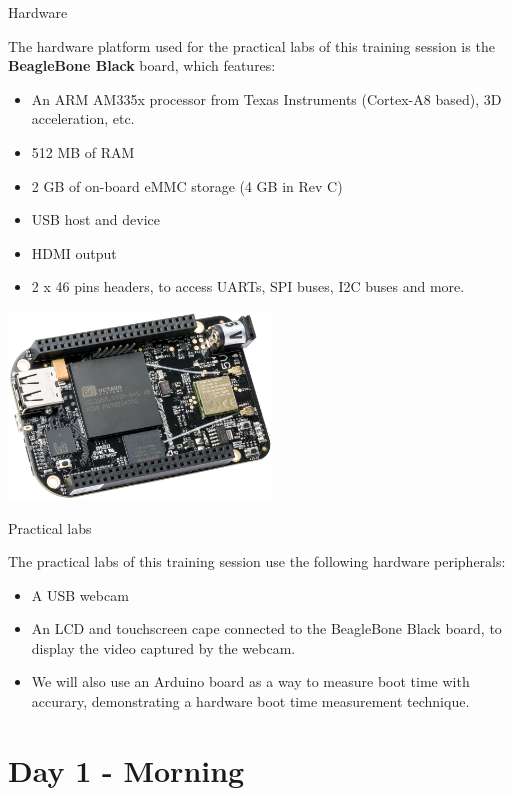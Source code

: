 \documentclass[a4paper,12pt,obeyspaces,spaces,hyphens]{article}
\begin{document}
\feagendatwocolumn
{Hardware}
{
  The hardware platform used for the practical labs of this training
  session is the {\bf BeagleBone Black} board, which features:

  \begin{itemize}
  \item An ARM AM335x processor from Texas Instruments (Cortex-A8
    based), 3D acceleration, etc.
  \item 512 MB of RAM
  \item 2 GB of on-board eMMC storage
        \newline(4 GB in Rev C)
  \item USB host and device
  \item HDMI output
  \item 2 x 46 pins headers, to access UARTs, SPI buses, I2C buses
    and more.
  \end{itemize}
}
{}
{
  \begin{center}
    \includegraphics[height=5cm]{../slides/beagleboneblack-board/beagleboneblack.png}
  \end{center}
}

\feagendaonecolumn
{Practical labs}
{
  The practical labs of this training session use the following
  hardware peripherals:

  \begin{itemize}
  \item A USB webcam
  \item An LCD and touchscreen cape connected to the
    BeagleBone Black board, to display the video captured by the webcam.
  \item We will also use an Arduino board as a way to measure boot time with accurary,
    demonstrating a hardware boot time measurement technique.
  \end{itemize}
}

\section{Day 1 - Morning}
\end{document}
